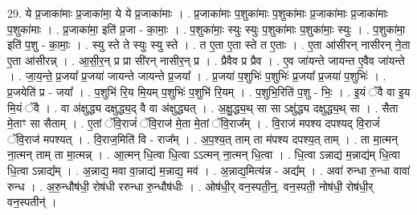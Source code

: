 \documentclass[17pt]{extarticle}
\begin{document}
29. ये प्र॒जाका॑माः प्र॒जाका॑मा॒ ये ये प्र॒जाका॑माः । . प्र॒जाका॑माः प॒शुका॑माः प॒शुका॑माः प्र॒जाका॑माः प्र॒जाका॑माः प॒शुका॑माः । . प्र॒जाका॑मा॒ इति॑ प्र॒जा - का॒माः॒ । . प॒शुका॑माः॒ स्युः स्युः प॒शुका॑माः प॒शुका॑माः॒ स्युः । . प॒शुका॑मा॒ इति॑ प॒शु - का॒माः॒ । . स्यु स्ते ते स्युः स्यु स्ते । . त ए॒ता ए॒ता स्ते त ए॒ताः । . ए॒ता आ॑सीरन् नासीरन् ने॒ता ए॒ता आ॑सीरन्न् । . आ॒सी॒र॒न् प्र प्रा सी॑रन् नासीर॒न् प्र । . प्रैवैव प्र प्रैव । . ए॒व जा॑यन्ते जायन्त ए॒वैव जा॑यन्ते । . जा॒य॒न्ते॒ प्र॒जया᳚ प्र॒जया॑ जायन्ते जायन्ते प्र॒जया᳚ । . प्र॒जया॑ प॒शुभिः॑ प॒शुभिः॑ प्र॒जया᳚ प्र॒जया॑ प॒शुभिः॑ । . प्र॒जयेति॑ प्र - जया᳚ । . प॒शुभि॑ रि॒य मि॒यम् प॒शुभिः॑ प॒शुभि॑ रि॒यम् । . प॒शुभि॒रिति॑ प॒शु - भिः॒ । . इ॒यं ॅवै वा इ॒य मि॒यं ॅवै । . वा अ॑क्षुद्ध्य दक्षुद्ध्य॒द् वै वा अ॑क्षुद्ध्यत् । . अ॒क्षु॒द्ध्य॒थ् सा सा ऽक्षु॑द्ध्य दक्षुद्ध्य॒थ् सा । . सैता मे॒ताꣳ सा सैताम् । . ए॒तां ॅवि॒राजं॑ ॅवि॒राज॑ मे॒ता मे॒तां ॅवि॒राज᳚म् । . वि॒राज॑ मपश्य दपश्यद् वि॒राजं॑ ॅवि॒राज॑ मपश्यत् । . वि॒राज॒मिति॑ वि - राज᳚म् । . अ॒प॒श्य॒त् ताम् ता म॑पश्य दपश्य॒त् ताम् । . ता मा॒त्मन् ना॒त्मन् ताम् ता मा॒त्मन्न् । . आ॒त्मन् धि॒त्वा धि॒त्वा ऽऽत्मन् ना॒त्मन् धि॒त्वा । . धि॒त्वा ऽन्नाद्य॑ म॒न्नाद्य॑म् धि॒त्वा धि॒त्वा ऽन्नाद्य᳚म् । . अ॒न्नाद्य॒ मवा वा॒न्नाद्य॑ म॒न्नाद्य॒ मव॑ । . अ॒न्नाद्य॒मित्य॑न्न - अद्य᳚म् । . अवा॑ रुन्धा रु॒न्धा वावा॑ रुन्ध । . अ॒रु॒न्धौष॑धी॒ रोष॑धी ररुन्धा रु॒न्धौष॑धीः । . ओष॑धी॒र् वन॒स्पती॒न्॒. वन॒स्पती॒ नोष॑धी॒ रोष॑धी॒र् वन॒स्पतीन्॑ । \newline
\end{document}
